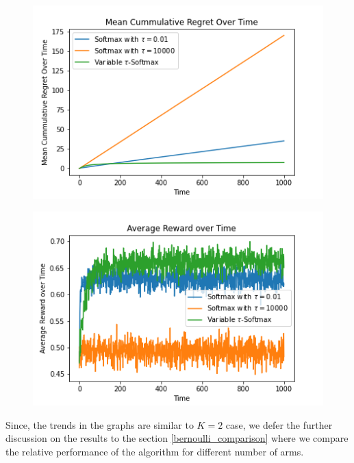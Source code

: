\documentclass{article}
\begin{document}
		\begin{figure}[H]
		\graphicspath{ {../Experiments/Bernoulli_10_All/} }
		\centering
		\begin{minipage}{.5\textwidth}
		  \centering
		  \includegraphics[width=\linewidth]{Mean_Cummulative_Regret_Over_Time.png}
		  \label{fig:test1}
		\end{minipage}%
		\begin{minipage}{.5\textwidth}
		  \centering
		  \includegraphics[width=\linewidth]{Average_Reward_over_Time.png}
		  \label{fig:test2}
		\end{minipage}
		\end{figure} 
		
		Since, the trends in the graphs are similar to $K=2$ case, we defer the further discussion on the results to the section \ref{bernoulli_comparison} where we compare
		the relative performance of the algorithm for different number of arms.
		
\end{document}
